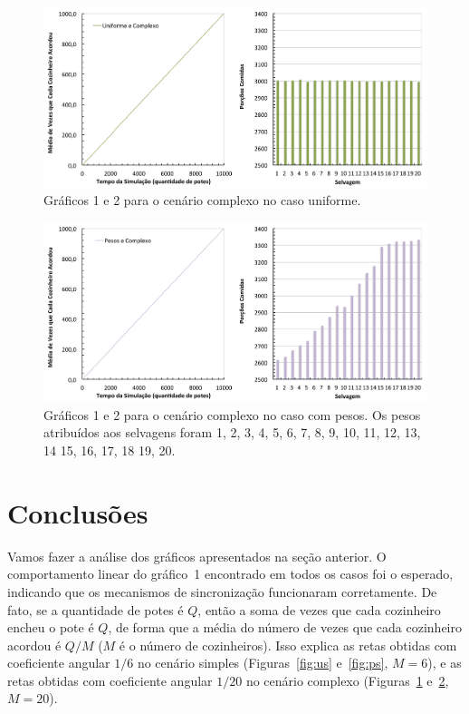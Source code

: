 \documentclass[11pt,a4paper]{article}
\begin{document}
\begin{figure}[htbp]
  \begin{center} 
    \includegraphics[scale=0.5]{uniforme_complexo.pdf}
    \caption{Gráficos 1 e 2 para o cenário complexo no caso uniforme.}
    \label{fig:uc}
  \end{center}
\end{figure}
%
\begin{figure}[htbp]
  \begin{center} 
    \includegraphics[scale=0.5]{pesos_complexo.pdf}
    \caption{Gráficos 1 e 2 para o cenário complexo no caso com pesos. Os pesos atribuídos aos 
    selvagens foram 1, 2, 3, 4, 5, 6, 7, 8, 9, 10, 11, 12, 13, 14 15, 16, 17, 18 19, 20.}
    \label{fig:pc}
  \end{center}
\end{figure}


\section{Conclusões}
\label{sec:conc}

Vamos fazer a análise dos gráficos apresentados na seção anterior. O comportamento linear do 
gráfico~1 encontrado em todos os casos foi o esperado, indicando que os mecanismos de sincronização 
funcionaram corretamente. De fato, se a quantidade de potes é $Q$, então a soma de vezes que cada 
cozinheiro encheu o pote é $Q$, de forma que a média do número de vezes que cada cozinheiro acordou 
é $Q/M$ ($M$ é o número de cozinheiros). Isso explica as retas obtidas com coeficiente angular $1/6$ 
no cenário simples (Figuras~\ref{fig:us} e~\ref{fig:ps}, $M = 6$), e as retas obtidas com 
coeficiente angular $1/20$ no cenário complexo (Figuras~\ref{fig:uc} e~\ref{fig:pc}, $M = 20$).
\end{document}
